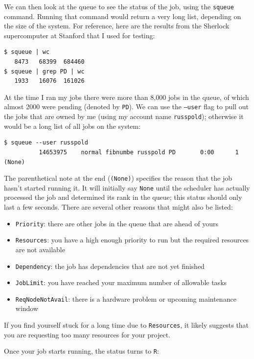 We can then look at the queue to see the status of the job, using the \texttt{squeue} command.  Running that command would return a very long list, depending on the size of the system. For reference, here are the results from the Sherlock supercomputer at Stanford that I used for testing:

\begin{lstlisting}[style=shellshort]
$ squeue | wc
   8473   68399  684460
$ squeue | grep PD | wc
   1933   16076  161026
\end{lstlisting}

At the time I ran my jobs there were more than 8,000 jobs in the queue, of which almost 2000 were pending (denoted by \texttt{PD}). We can use the \texttt{--user} flag to pull out the jobs that are owned by me (using my account name \texttt{russpold}); otherwise it would be a long list of all jobs on the system:

\begin{lstlisting}[style=shellshort]
$ squeue --user russpold
          14653975    normal fibnumbe russpold PD       0:00      1 (None)
\end{lstlisting}

The parenthetical note at the end (\texttt{(None)}) specifies the reason that the job hasn't started running it.  It will initially say \texttt{None} until the scheduler has actually processed the job and determined its rank in the queue; this status should only last a few seconds.  There are several other reasons that might also be listed:

\begin{itemize}
\item \texttt{Priority}: there are other jobs in the queue that are ahead of yours
\item \texttt{Resources}: you have a high enough priority to run but the required resources are not available
\item \texttt{Dependency}:  the job has dependencies that are not yet finished
\item \texttt{JobLimit}: you have reached your maximum number of allowable tasks
\item \texttt{ReqNodeNotAvail}: there is a hardware problem or upcoming maintenance window
\end{itemize}

If you find yourself stuck for a long time due to \texttt{Resources}, it likely suggests that you are requesting too many resources for your project.

Once your job starts running, the status turns to \texttt{R}:

